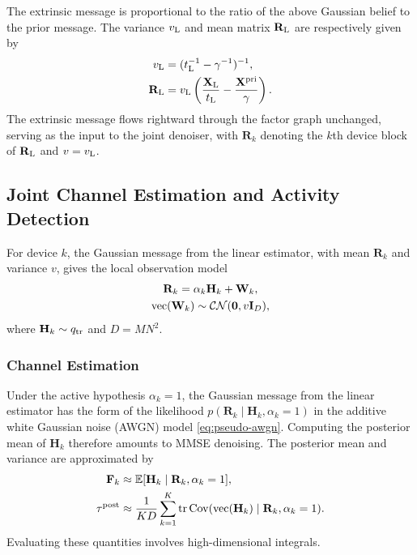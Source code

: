 The extrinsic message is proportional to the ratio of the above Gaussian
belief to the prior message. The variance $v_{\rm L}$ and mean matrix
$\mathbf R_{\rm L}$ are respectively given by
\begin{align}
 v_{\rm L}&=(t_{\rm L}^{-1}-\gamma^{-1})^{-1},
 \label{eq:linear-extrinsic}\\
 \mathbf R_{\rm L}&=v_{\rm L}
 \left(\frac{\mathbf X_{\rm L}}{t_{\rm L}}
       -\frac{\mathbf X^{\rm pri}}{\gamma}\right).
 \label{eq:linear-extrinsic-mean}
\end{align}
The extrinsic message flows rightward through the factor graph unchanged,
serving as the input to the joint denoiser, with $\mathbf R_k$ denoting the $k$th
device block of $\mathbf R_{\rm L}$ and $v=v_{\rm L}$.

\subsection{Joint Channel Estimation and Activity Detection}
\label{sec:joint-denoising}

For device $k$, the Gaussian message from the linear estimator,
with mean $\mathbf R_k$ and variance $v$, gives the local observation model
\begin{equation}
 \begin{gathered}
 \mathbf R_k=\alpha_k \mathbf H_k+\mathbf W_k,\\
 \operatorname{vec}(\mathbf W_k)\sim\mathcal{CN}(\mathbf0,v\mathbf{I}_D),
 \end{gathered}
 \label{eq:pseudo-awgn}
\end{equation}
where $\mathbf H_k\sim q_{\rm tr}$ and $D=MN^2$.

\subsubsection{Channel Estimation}
\label{sec:channel-estimation}

Under the active hypothesis $\alpha_k=1$, the Gaussian message
from the linear estimator has the form of the likelihood
$p(\mathbf R_k\mid\mathbf H_k,\alpha_k=1)$ in the additive white Gaussian noise (AWGN) model
\eqref{eq:pseudo-awgn}. Computing the posterior mean of $\mathbf H_k$
therefore amounts to MMSE denoising. The posterior mean and variance are approximated by
\begin{align}
 \mathbf F_k&\approx
 \mathbb{E}[\mathbf H_k\mid\mathbf R_k,\alpha_k=1],
 \label{eq:conditional-channel-integrals}\\
 \tau^{\rm post}&\approx\frac1{KD}\sum_{k=1}^K\operatorname{tr}\operatorname{Cov}
 (\operatorname{vec}(\mathbf H_k)\mid\mathbf R_k,\alpha_k=1).
 \label{eq:conditional-channel-variance}
\end{align}
Evaluating these quantities involves high-dimensional integrals.

